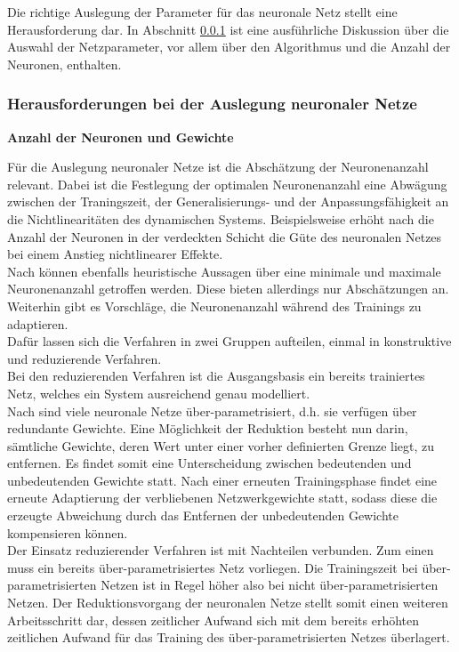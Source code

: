 Die richtige Auslegung der Parameter für das neuronale Netz stellt eine Herausforderung dar. In Abschnitt \ref{cha:ff_herausforderung} ist eine ausführliche Diskussion über die Auswahl der Netzparameter, vor allem über den Algorithmus und  die Anzahl der Neuronen, enthalten. \\ 

\subsubsection{Herausforderungen bei der Auslegung neuronaler Netze}
\label{cha:ff_herausforderung}

\textbf{Anzahl der Neuronen und Gewichte}

Für die Auslegung neuronaler Netze ist die Abschätzung der Neuronenanzahl relevant. Dabei ist die Festlegung der optimalen Neuronenanzahl eine Abwägung zwischen der Traningszeit, der Generalisierungs- und der Anpassungsfähigkeit an die Nichtlinearitäten des dynamischen Systems. Beispielsweise erhöht nach \cite{Fumumoto.2017} die Anzahl der Neuronen in der verdeckten Schicht die Güte des neuronalen Netzes bei einem Anstieg nichtlinearer Effekte. \\
Nach \cite{.2008} können ebenfalls heuristische Aussagen über eine minimale und maximale Neuronenanzahl getroffen werden. Diese bieten allerdings nur Abschätzungen an. Weiterhin gibt es Vorschläge, die Neuronenanzahl während des Trainings zu adaptieren.\\ 
Dafür lassen sich die Verfahren in zwei Gruppen aufteilen, einmal in konstruktive und reduzierende Verfahren. \\ 
Bei den reduzierenden Verfahren ist die Ausgangsbasis ein bereits trainiertes Netz, welches ein System ausreichend  genau modelliert. \\ 
Nach \cite{Han.682015} sind viele neuronale Netze über-parametrisiert, d.h. sie verfügen über redundante Gewichte. Eine Möglichkeit der Reduktion besteht nun darin, sämtliche Gewichte, deren Wert unter einer vorher definierten Grenze liegt, zu entfernen. Es findet somit eine Unterscheidung zwischen bedeutenden und unbedeutenden Gewichte statt. Nach einer erneuten Trainingsphase findet eine erneute Adaptierung der verbliebenen Netzwerkgewichte statt, sodass diese die erzeugte Abweichung durch das Entfernen der unbedeutenden Gewichte kompensieren können. \cite{Han.682015} \\
Der Einsatz reduzierender Verfahren ist mit Nachteilen verbunden. Zum einen muss ein bereits über-parametrisiertes Netz vorliegen. Die Trainingszeit bei über-parametrisierten Netzen ist in Regel höher also bei nicht über-parametrisierten Netzen. Der Reduktionsvorgang der neuronalen Netze stellt somit einen weiteren Arbeitsschritt dar, dessen zeitlicher Aufwand sich mit dem bereits erhöhten zeitlichen Aufwand für das Training des über-parametrisierten Netzes überlagert. \\
